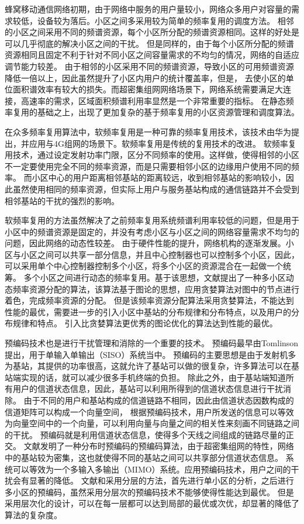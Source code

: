 蜂窝移动通信网络初期，由于网络中服务的用户量较小，网络众多用户对容量的需求较低，设备较为落后。小区之间多采用较为简单的频率复用的调度方法。
相邻的小区之间采用不同的频谱资源，每个小区所分配的频谱资源相同。这样的好处是可以几乎彻底的解决小区之间的干扰。
但是同样的，由于每个小区所分配的频谱资源相同且固定不利于针对不同小区之间容量需求的不均匀的情况，网络的自适应调节能力较差。
由于相邻的小区采用不同的频谱资源，导致小区的可用频谱资源降低一倍以上，因此虽然提升了小区内用户的统计覆盖率，但是，
去使小区的单位面积谱效率有较大的损失。而超密集组网网络场景下，网络系统需要满足大连接，高速率的需求，区域面积频谱利用率显然是一个非常重要的指标。
在静态频率复用的基础之上，出现了更加复杂的基于频率复用的小区资源管理和调度算法。

在众多频率复用算法中，软频率复用是一种可靠的频率复用技术，该技术由华为提出，并应用与4G组网的场景下。软频率复用是传统的复用技术的改进。
软频率复用技术，通过设定发射功率门限，区分不同频率的使用。这样做，使得相邻的小区不一定要使用完全不同的频率资源，而是只需要相邻小区的边缘用户使用不同的频率。
而小区中心的用户距离相邻基站的距离较远，收到相邻基站的影响较小，因此虽然使用相同的频率资源，但实际上用户与服务基站构成的通信链路并不会受到相邻基站的干扰的强烈的影响。

软频率复用的方法虽然解决了之前频率复用系统频谱利用率较低的问题，但是用于小区中的频谱资源是固定的，并没有考虑小区与小区之间的网络容量需求不均匀的问题，因此网络的动态性较差。
由于硬件性能的提升，网络机构的逐渐发展。小区与小区之间可以共享一部分信息，并且中心控制器也可以控制多个小区，因此，可以采用单个中心控制器控制多个小区，将多个小区的资源混合在一起做一个统筹。
多个小区之间进行动态的频率复用。基于该思想，文献\cite{4LRA}提出了一种多小区动态频率资源分配的算法，该算法基于图论的思想，应用贪婪算法对图中的节点进行着色，完成频率资源的分配。
但是该频率资源分配算法采用贪婪算法，不能达到性能的最优，需要进一步的引入小区中基站的分布规律和分布特点，以及用户的分布规律和特点。
引入比贪婪算法更优秀的图论优化的算法达到性能的最优。

预编码技术也是进行干扰管理和消除的一个重要的技术。
预编码最早由Tomlinson提出，用于单输入单输出（SISO）系统当中。
预编码的主要思想是由于发射机多为基站，其提供的功率很高，这就允许了基站可以做的很复杂，许多算法可以在基站端实现的话，就可以减少很多手机终端的负担。
除此之外，由于基站端知道所有用户的信道状态信息，因此，基站可以利用所得到的信道状态信息进行干扰消除。
由于不同的用户和基站构成的信道链路不相同，因此由信道状态因数构成的信道矩阵可以构成一个向量空间，
根据预编码技术，用户所发送的信息可以等效为向量空间中的一个向量，可以利用向量与向量之间的相关性来刻画不同链路之间的干扰。
预编码就是利用信道状态信息，使得多个天线之间组成的链路尽量的正交。
文献\cite{DisPrecode}发明了一种分布时预编码的预编码算法，由于超密集组网的特性，网络中的基站较为密集，这也就使得不同的基站之间可以共享部分信道状态信息。
系统可以等效为一个多输入多输出（MIMO）系统。应用预编码技术，用户之间的干扰会有显著的降低。
文献\cite{LayerPrecode}和\cite{Layer2Precode}采用分层的方法，首先进行单小区的分析，之后进行多小区的预编码，虽然采用分层次的预编码技术不能够使得性能达到最优。
但是采用层次化的设计，可以在每一层都可以达到局部的最优或次优，却显著的降低了算法的复杂度。

